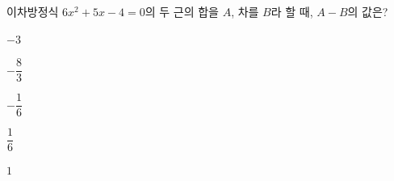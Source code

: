 이차방정식 $6x^2+5x-4=0$의 두 근의 합을 $A$, 차를 $B$라 할 때, $A-B$의 값은?
\begin{choices32}{\rule[-3ex]{0pt}{8ex}$-3$}{\rule[-3ex]{0pt}{8ex}$-\dfrac{8}{3}$}{\rule[-3ex]{0pt}{8ex}$-\dfrac{1}{6}$}{\rule[-3ex]{0pt}{8ex}$\dfrac{1}{6}$}{\rule[-3ex]{0pt}{8ex}$1$}\end{choices32}

